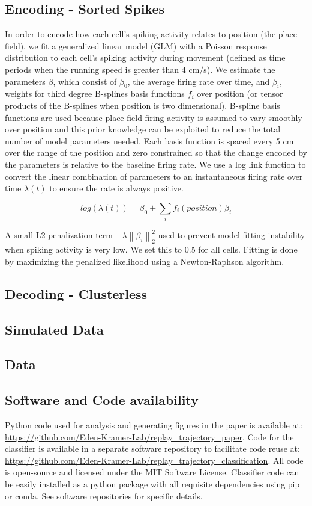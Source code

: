 \documentclass[times, twoside]{zHenriquesLab-StyleBioRxiv}
\newcommand{\norm}[1]{\left\lVert #1 \right\rVert}
\begin{document}
\subsection*{Encoding - Sorted Spikes}
In order to encode how each cell's spiking activity relates to position (the place field), we fit a generalized linear model (GLM) with a Poisson response distribution to each cell's spiking activity during movement (defined as time periods when the running speed is greater than 4 cm/s). We estimate the parameters $\beta$, which consist of $\beta_{0}$, the average firing rate over time, and $\beta_{i}$, weights for third degree B-splines basis functions $f_{i}$ over position (or tensor products of the B-splines when position is two dimensional). B-spline basis functions are used because place field firing activity is assumed to vary smoothly over position and this prior knowledge can be exploited to reduce the total number of model parameters needed. Each basis function is spaced every 5 cm over the range of the position and zero constrained so that the change encoded by the parameters is relative to the baseline firing rate. We use a log link function to convert the linear combination of parameters to an instantaneous firing rate over time $\lambda(t)$ to ensure the rate is always positive. 

$$log(\lambda(t)) = \beta_{0} + \sum_{i} f_{i}(position)\beta_{i}$$

A small L2 penalization term $-\lambda\norm{\beta_{i}}_{2}^{2}$ used to prevent model fitting instability when spiking activity is very low. We set this to 0.5 for all cells. Fitting is done by maximizing the penalized likelihood using a Newton-Raphson algorithm.

\subsection*{Decoding - Clusterless}


\subsection*{Simulated Data}

\subsection*{Data}

\subsection*{Software and Code availability}
Python code used for analysis and generating figures in the paper is available at: \url{https://github.com/Eden-Kramer-Lab/replay_trajectory_paper}. Code for the classifier is available in a separate software repository to facilitate code reuse at: \url{https://github.com/Eden-Kramer-Lab/replay_trajectory_classification}. All code is open-source and licensed under the MIT Software License. Classifier code can be easily installed as a python package with all requisite dependencies using pip or conda. See software repositories for specific details.
\end{document}
